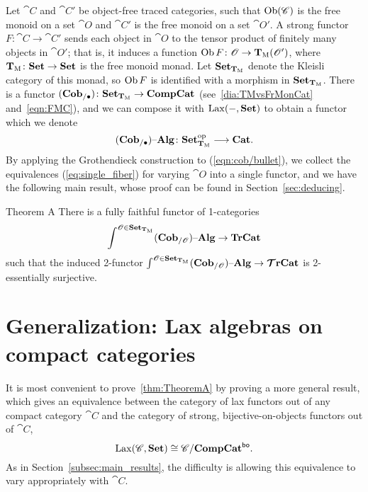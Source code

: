 \documentclass[12pt,oneside,article,draft]{memoir}
\begin{document}
Let $\cat{C}$ and $\cat{C}'$ be object-free traced categories, such that $\operatorname{Ob}(\mathscr{C})$ is the free
monoid on a set $\cat{O}$ and $\cat{C}'$ is the free monoid on a set $\cat{O}'$. A strong functor
$F\colon \cat{C}\to \cat{C'}$ sends each object in $\cat{O}$ to the tensor product of finitely many
objects in $\cat{O'}$; that is, it induces a function $\operatorname{Ob} F\colon\mathscr{O}\to\mathbf{T}_{\textrm{M}}(\mathscr{O'})$, where
$\mathbf{T}_{\textrm{M}}\colon\mathbf{Set}\to\mathbf{Set}$ is the free monoid monad. Let $\mathbf{Set}_{\mathbf{T}_{\textrm{M}}}$ denote the Kleisli category of
this monad, so $\operatorname{Ob} F$ is identified with a morphism in $\mathbf{Set}_{\mathbf{T}_{\textrm{M}}}$. There is a functor
$(\mathbf{Cob}_{/\bullet})\colon\mathbf{Set}_{\mathbf{T}_{\textrm{M}}}\to\mathbf{CompCat}$ (see~\eqref{dia:TMvsFrMonCat} and~\eqref{eqn:FMC}),
%
and we can compose it with $\operatorname{Lax}(-,\mathbf{Set})$ to obtain a functor which we denote
\begin{equation}\label{eqn:cob/bullet}
   (\mathbf{Cob}_{/\bullet}){\text \textendash}\mathbf{Alg}\colon\mathbf{Set}_{\mathbf{T}_{\textrm{M}}}^{\mathrm{op}}\longrightarrow\mathbf{Cat}.
\end{equation}
By applying the Grothendieck construction to (\ref{eqn:cob/bullet}), we collect the equivalences
(\ref{eq:single_fiber}) for varying $\cat{O}$ into a single functor, and we have the following main
result, whose proof can be found in Section~\ref{sec:deducing}.

\begin{named}{Theorem A}\label{thm:TheoremA}
   There is a fully faithful functor of 1-categories
   \begin{equation*}
      \int^{\mathscr{O}\in\mathbf{Set}_{\mathbf{T}_{\textrm{M}}}}(\mathbf{Cob}_{/\mathscr{O}}){\text \textendash}\mathbf{Alg} \to \mathbf{TrCat}
   \end{equation*}
   such that the induced 2-functor $\int^{\mathscr{O}\in\mathbf{Set}_{\mathbf{T}_{\textrm{M}}}}(\mathbf{Cob}_{/\mathscr{O}}){\text \textendash}\mathbf{Alg}\to\bm{\mathcal{T}}\mathbf{rCat}$ is 2-essentially surjective.
\end{named}

\section{Generalization: Lax algebras on compact categories}

It is most convenient to prove~\ref{thm:TheoremA} by proving a more general result, which gives an
equivalence between the category of lax functors out of any compact category $\cat{C}$ and the
category of strong, bijective-on-objects functors out of $\cat{C}$,
\begin{equation}\label{eqn:lax_compcat_bo}
\operatorname{Lax}(\mathscr{C},\mathbf{Set})\cong\mathscr{C}/\mathbf{CompCat}^{\mathsf{bo}}.
\end{equation}
As in Section~\ref{subsec:main_results}, the difficulty is allowing this equivalence to vary appropriately with $\cat{C}$.
\end{document}
